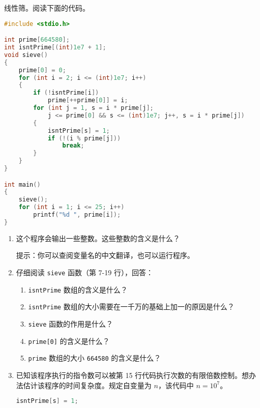 
\begin{problemset}
	\item 线性筛。阅读下面的代码。

	\begin{lstlisting}[language=c, moreemph={[2]sieve}]
#include <stdio.h>

int prime[664580];
int isntPrime[(int)1e7 + 1];
void sieve()
{
	prime[0] = 0;
	for (int i = 2; i <= (int)1e7; i++)
	{
		if (!isntPrime[i])
			prime[++prime[0]] = i;
		for (int j = 1, s = i * prime[j];
			j <= prime[0] && s <= (int)1e7; j++, s = i * prime[j])
		{
			isntPrime[s] = 1;
			if (!(i % prime[j]))
				break;
		}
	}
}

int main()
{
	sieve();
	for (int i = 1; i <= 25; i++)
		printf("%d ", prime[i]);
}
	\end{lstlisting}

	\begin{enumerate}
		\item 这个程序会输出一些整数。这些整数的含义是什么？

		提示：你可以查阅变量名的中文翻译，也可以运行程序。

		\item 仔细阅读 \lstinline[language=c, moreemph={[2]sieve}]{sieve} 函数（第 7-19 行），回答：
		\begin{enumerate}
			\item \lstinline{isntPrime} 数组的含义是什么？
			\item \lstinline{isntPrime} 数组的大小需要在一千万的基础上加一的原因是什么？
			\item \lstinline[language=c, moreemph={[2]sieve}]{sieve} 函数的作用是什么？
			\item \lstinline{prime[0]} 的含义是什么？
			\item \lstinline{prime} 数组的大小 \lstinline{664580} 的含义是什么？
		\end{enumerate}

		\item 已知该程序执行的指令数可以被第 15 行代码执行次数的有限倍数控制。想办法估计该程序的时间复杂度。规定自变量为 $n$，该代码中 $n = 10^7$。

		\begin{lstlisting}[language=c, firstnumber=15]
			isntPrime[s] = 1;
		\end{lstlisting}


\end{enumerate}
\end{problemset}
